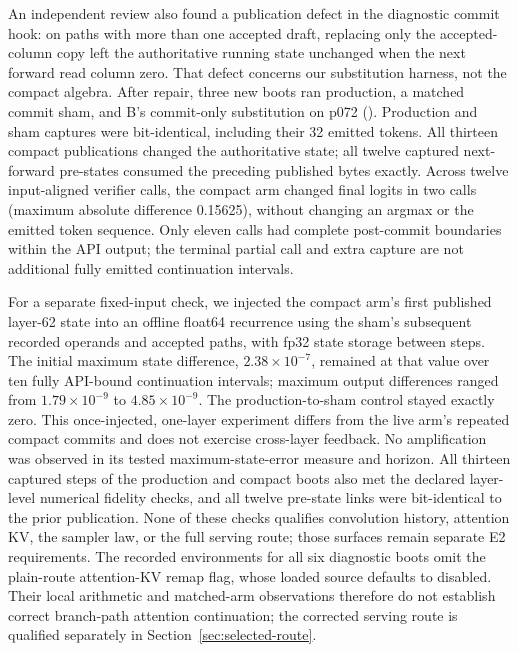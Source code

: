 \documentclass[conference]{IEEEtran}
\begin{document}
An independent review also found a publication defect in the diagnostic commit hook: on paths with more than one accepted draft, replacing only the accepted-column copy left the authoritative running state unchanged when the next forward read column zero. That defect concerns our substitution harness, not the compact algebra. After repair, three new boots ran production, a matched commit sham, and B's commit-only substitution on p072 (). Production and sham captures were bit-identical, including their 32 emitted tokens. All thirteen compact publications changed the authoritative state; all twelve captured next-forward pre-states consumed the preceding published bytes exactly. Across twelve input-aligned verifier calls, the compact arm changed final logits in two calls (maximum absolute difference 0.15625), without changing an argmax or the emitted token sequence. Only eleven calls had complete post-commit boundaries within the API output; the terminal partial call and extra capture are not additional fully emitted continuation intervals.

For a separate fixed-input check, we injected the compact arm's first published layer-62 state into an offline float64 recurrence using the sham's subsequent recorded operands and accepted paths, with fp32 state storage between steps. The initial maximum state difference, $2.38\times10^{-7}$, remained at that value over ten fully API-bound continuation intervals; maximum output differences ranged from $1.79\times10^{-9}$ to $4.85\times10^{-9}$. The production-to-sham control stayed exactly zero. This once-injected, one-layer experiment differs from the live arm's repeated compact commits and does not exercise cross-layer feedback. No amplification was observed in its tested maximum-state-error measure and horizon. All thirteen captured steps of the production and compact boots also met the declared layer-level numerical fidelity checks, and all twelve pre-state links were bit-identical to the prior publication. None of these checks qualifies convolution history, attention KV, the sampler law, or the full serving route; those surfaces remain separate E2 requirements. The recorded environments for all six diagnostic boots omit the plain-route attention-KV remap flag, whose loaded source defaults to disabled. Their local arithmetic and matched-arm observations therefore do not establish correct branch-path attention continuation; the corrected serving route is qualified separately in Section~\ref{sec:selected-route}.
\end{document}
